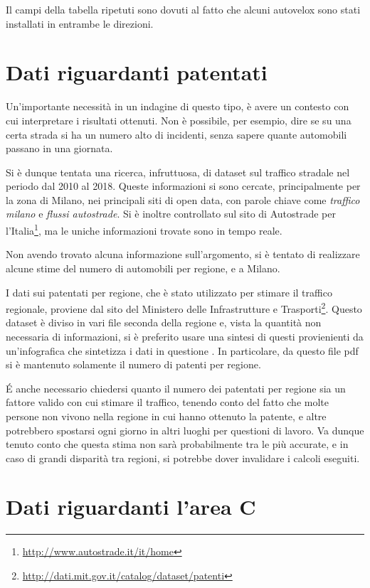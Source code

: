 \documentclass[a4paper,12pt]{report}
\newcommand{\quotestyle}[1]{\textit{#1}}
\begin{document}
Il campi della tabella ripetuti sono dovuti al fatto che alcuni autovelox sono stati 
installati in entrambe le direzioni.

\section{Dati riguardanti patentati}

Un'importante necessità in un indagine di questo tipo, è avere un contesto con cui 
interpretare i risultati ottenuti. 
Non è possibile, per esempio, dire se su una certa strada si ha un numero alto di 
incidenti, senza sapere quante automobili passano in una giornata.

Si è dunque tentata una ricerca, infruttuosa, di dataset sul traffico stradale nel periodo 
dal 2010 al 2018.
Queste informazioni si sono cercate, principalmente per la zona di Milano, nei principali 
siti di open data, con parole chiave come \quotestyle{traffico milano} e 
\quotestyle{flussi autostrade}. 
Si è inoltre controllato sul sito di Autostrade per 
l'Italia\footnote{\url{http://www.autostrade.it/it/home}}, 
ma le uniche informazioni trovate sono in tempo reale.

Non avendo trovato alcuna informazione sull'argomento, si è tentato di realizzare 
alcune stime del numero di automobili per regione, e a Milano.

I dati sui patentati per regione, che è stato utilizzato per stimare il traffico 
regionale, proviene dal sito del Ministero delle Infrastrutture e 
Trasporti\footnote{\url{http://dati.mit.gov.it/catalog/dataset/patenti}}.
Questo dataset è diviso in vari file seconda della regione e, vista la quantità 
non necessaria di informazioni, si è preferito usare una sintesi di questi provienienti da 
un'infografica che sintetizza i dati in questione \cite{INFOGRAFICA_MIT:1}.
In particolare, da questo file pdf si è mantenuto solamente il numero di patenti per regione.

\'E anche necessario chiedersi quanto il numero dei patentati per regione sia un 
fattore valido con cui stimare il traffico, tenendo conto del fatto che molte 
persone non vivono nella regione 
in cui hanno ottenuto la patente, e altre potrebbero spostarsi ogni giorno in altri 
luoghi per questioni di lavoro. 
Va dunque tenuto conto che questa stima non sarà probabilmente tra le più accurate, 
e in caso di grandi disparità tra regioni, si potrebbe dover invalidare i calcoli eseguiti.

\section{Dati riguardanti l'area C}
\end{document}
